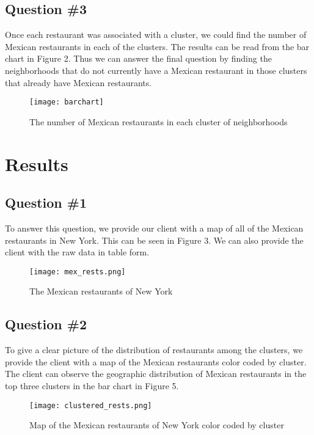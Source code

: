 \documentclass{article}
\begin{document}
\subsection{Question \#3}

Once each restaurant was associated with a cluster, we could find the number of Mexican restaurants in each of the clusters. The results can be read from the bar chart in Figure 2. Thus we can answer the final question by finding the neighborhoods that do not currently have a Mexican restaurant in those clusters that already have Mexican restaurants.

\begin{figure}[h!]
\texttt{[image: barchart]}
\centering
\caption[Figure 2]{The number of Mexican restaurants in each cluster of neighborhoods}
\end{figure}

\section{Results}

\subsection{Question \#1}

To answer this question, we provide our client with a map of all of the Mexican restaurants in New York. This can be seen in Figure 3. We can also provide the client with the raw data in table form.

\begin{figure}[h]
\texttt{[image: mex\_rests.png]}
\centering
\caption{The Mexican restaurants of New York}
\end{figure}

\subsection{Question \#2}

To give a clear picture of the distribution of restaurants among the clusters, we provide the client with a map of the Mexican restaurants color coded by cluster. The client can observe the geographic distribution of Mexican restaurants in the top three clusters in the bar chart in Figure 5.

\begin{figure}[h]
\texttt{[image: clustered\_rests.png]}
\centering
\caption{Map of the Mexican restaurants of New York color coded by cluster}
\end{figure}
\end{document}
